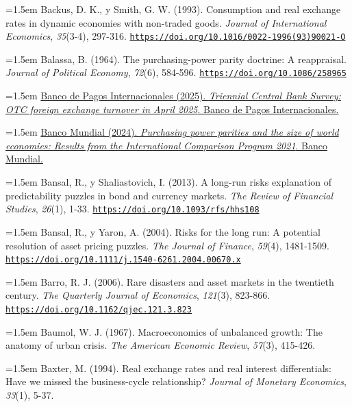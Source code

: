 \documentclass[10pt,a4paper]{article}
\begin{document}
\noindent\hangindent=1.5em Backus, D. K., y Smith, G. W. (1993). Consumption and real exchange rates in dynamic economies with non-traded goods. \textit{Journal of International Economics}, \textit{35}(3-4), 297-316. \href{https://doi.org/10.1016/0022-1996(93)90021-O}{\nolinkurl{https://doi.org/10.1016/0022-1996(93)90021-O}}

\noindent\hangindent=1.5em Balassa, B. (1964). The purchasing-power parity doctrine: A reappraisal. \textit{Journal of Political Economy}, \textit{72}(6), 584-596. \href{https://doi.org/10.1086/258965}{\nolinkurl{https://doi.org/10.1086/258965}}

\noindent\hangindent=1.5em \href{https://www.bis.org/statistics/rpfx25_fx.htm}{Banco de Pagos Internacionales (2025). \textit{Triennial Central Bank Survey: OTC foreign exchange turnover in April 2025}. Banco de Pagos Internacionales.}

\noindent\hangindent=1.5em \href{https://www.worldbank.org/en/programs/icp/brief/ICP2021}{Banco Mundial (2024). \textit{Purchasing power parities and the size of world economies: Results from the International Comparison Program 2021}. Banco Mundial.}

\noindent\hangindent=1.5em Bansal, R., y Shaliastovich, I. (2013). A long-run risks explanation of predictability puzzles in bond and currency markets. \textit{The Review of Financial Studies}, \textit{26}(1), 1-33. \href{https://doi.org/10.1093/rfs/hhs108}{\nolinkurl{https://doi.org/10.1093/rfs/hhs108}}

\noindent\hangindent=1.5em Bansal, R., y Yaron, A. (2004). Risks for the long run: A potential resolution of asset pricing puzzles. \textit{The Journal of Finance}, \textit{59}(4), 1481-1509. \href{https://doi.org/10.1111/j.1540-6261.2004.00670.x}{\nolinkurl{https://doi.org/10.1111/j.1540-6261.2004.00670.x}}

\noindent\hangindent=1.5em Barro, R. J. (2006). Rare disasters and asset markets in the twentieth century. \textit{The Quarterly Journal of Economics}, \textit{121}(3), 823-866. \href{https://doi.org/10.1162/qjec.121.3.823}{\nolinkurl{https://doi.org/10.1162/qjec.121.3.823}}

\noindent\hangindent=1.5em Baumol, W. J. (1967). Macroeconomics of unbalanced growth: The anatomy of urban crisis. \textit{The American Economic Review}, \textit{57}(3), 415-426.

\noindent\hangindent=1.5em Baxter, M. (1994). Real exchange rates and real interest differentials: Have we missed the business-cycle relationship? \textit{Journal of Monetary Economics}, \textit{33}(1), 5-37.
\end{document}
